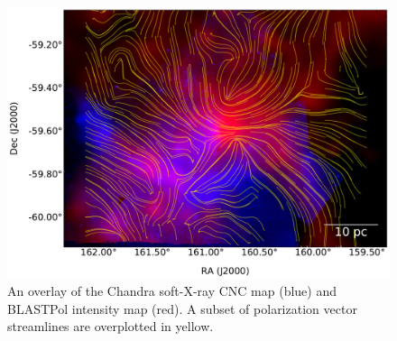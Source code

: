 \begin{figure}[!htbp]
\centering
\includegraphics[width=\textwidth]{figures/carina/chandra_soft_sl}
\caption[An overlay of the Chandra soft-X-ray CNC map (blue) and BLASTPol intensity map (red).]{An overlay of the Chandra soft-X-ray CNC map (blue) \citep{townsley2011introduction} and BLASTPol intensity map (red). A subset of polarization vector streamlines are overplotted in yellow.}
\label{fig:chandra_overplot}
\end{figure}

